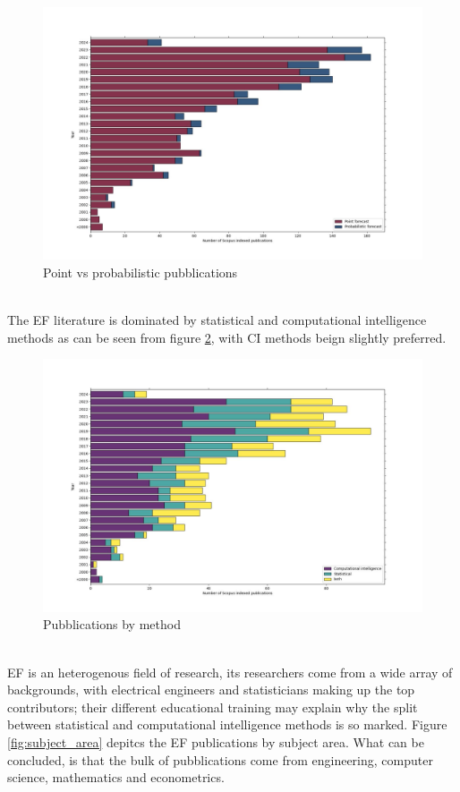 \begin{figure}
  \includegraphics[width=\textwidth]{images/point_vs_prob.jpg}
  \caption{Point vs probabilistic pubblications}
  \label{fig:point_vs_prob}
\end{figure}
\\
The EF literature is dominated by statistical and computational intelligence methods as can be seen from figure \ref{fig:cs_stat_both}, with CI methods beign slightly preferred. 
\begin{figure}
  \includegraphics[width=\textwidth]{images/cs_stat_both.jpg}
  \caption{Pubblications by method}
  \label{fig:cs_stat_both}
\end{figure}
\\
EF is an heterogenous field of research, its researchers come from a wide array of backgrounds, with electrical engineers and statisticians making up the top contributors; their different educational training may explain why the split between statistical and computational intelligence methods is so marked. Figure \ref{fig:subject_area} depitcs the EF publications by subject area. What can be concluded, is that the bulk of pubblications come from engineering, computer science, mathematics and econometrics.

